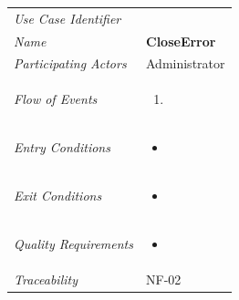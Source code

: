 \documentclass[12pt,letterpaper]{article}
\begin{document}
\begin{center}
	\begin{tabu} to 
		\toprule
		Use Case Identifier & \closeerror{} \\
		Name & {\bf CloseError} \\
		Participating Actors & Administrator \\
		Flow of Events & 
	    \begin{enumerate}[topsep=-1em,leftmargin=*]
		    \item 
		\end{enumerate} \\

		Entry Conditions &
		\begin{itemize}[topsep=-1em,leftmargin=*]
		    \item 
        \end{itemize} \\

		Exit Conditions &
		\begin{itemize}[topsep=-1em,leftmargin=*]
		    \item 
        \end{itemize} \\

		Quality Requirements &
		\begin{itemize}[topsep=-1em,leftmargin=*]
		    \item 
        \end{itemize} \\

		Traceability & NF-02 \\
		\toprule
	\end{tabu}
\end{center}
\end{document}
